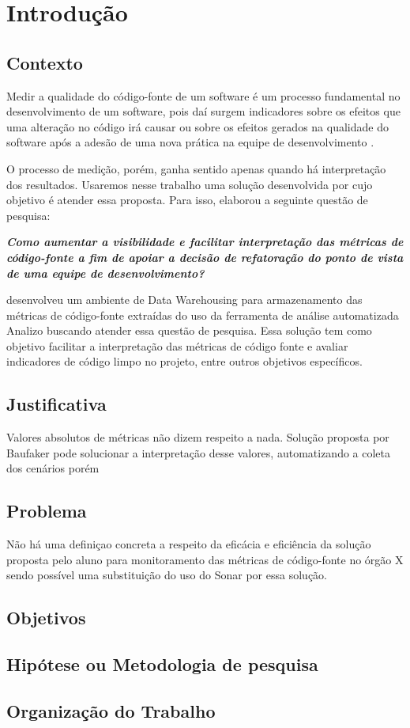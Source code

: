 \chapter{Introdução}

\section{Contexto}

Medir a qualidade do código-fonte  de um software é um processo fundamental no desenvolvimento de um software, pois daí surgem indicadores sobre os efeitos que uma alteração no código irá causar ou sobre os efeitos gerados na qualidade do software após a adesão de uma nova prática na equipe de desenvolvimento \cite{Fenton98}.

O processo de medição, porém, ganha sentido apenas quando há interpretação dos resultados. Usaremos nesse trabalho uma solução desenvolvida por  cujo objetivo é atender essa proposta. Para isso,  elaborou a seguinte questão de pesquisa: 

\textit{\textbf{Como aumentar a
visibilidade e facilitar interpretação das 
métricas de código-fonte
a fim de apoiar a decisão de refatoração
do ponto de vista de uma equipe de desenvolvimento?}}

 desenvolveu um ambiente de Data Warehousing para armazenamento das métricas de código-fonte extraídas do uso da ferramenta de análise  automatizada Analizo buscando atender essa questão de pesquisa. Essa solução tem como objetivo facilitar a interpretação das métricas de código fonte e avaliar indicadores de código limpo no projeto, entre outros objetivos específicos.

\section{Justificativa}

Valores absolutos de métricas não dizem respeito a nada. Solução proposta por Baufaker pode solucionar a interpretação desse valores, automatizando a coleta dos cenários porém

\section{Problema}

Não há uma definiçao concreta a respeito da eficácia e eficiência da solução proposta pelo aluno  para monitoramento das métricas de código-fonte no órgão X sendo possível uma substituição do uso do Sonar por essa solução.


\section{Objetivos}

\section{Hipótese ou Metodologia de pesquisa}

\section{Organização do Trabalho}
